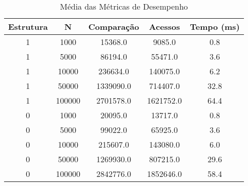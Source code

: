 \begin{table}[htbp]
\caption{Média das Métricas de Desempenho}
\label{tab:table1}
\begin{tabular}{c|c|c|c|c}
\textbf{Estrutura} & \textbf{N} & \textbf{Comparação} & \textbf{Acessos} & \textbf{Tempo (ms)}\\
\hline
1 & 1000 & 15368.0 & 9085.0 & 0.8\\
1 & 5000 & 86194.0 & 55471.0 & 3.6\\
1 & 10000 & 236634.0 & 140075.0 & 6.2\\
1 & 50000 & 1339090.0 & 714407.0 & 32.8\\
1 & 100000 & 2701578.0 & 1621752.0 & 64.4\\
0 & 1000 & 20095.0 & 13717.0 & 0.8\\
0 & 5000 & 99022.0 & 65925.0 & 3.6\\
0 & 10000 & 215607.0 & 143080.0 & 6.0\\
0 & 50000 & 1269930.0 & 807215.0 & 29.6\\
0 & 100000 & 2842776.0 & 1852646.0 & 58.4\\
\end{tabular}
\end{table}
